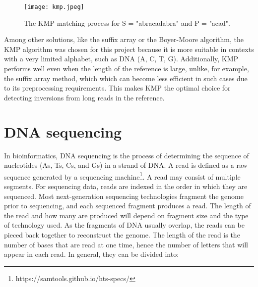 \begin{figure}[h]

  \centering
    \texttt{[image: kmp.jpeg]}
    \caption{The KMP matching process for S = "abracadabra" and P = "acad".}
  \label{fig:kmp}
\end{figure}

Among other solutions, like the suffix array or the Boyer-Moore algorithm, the KMP algorithm was chosen for this project because it is more suitable in contexts with a very limited alphabet, such as DNA ({A, C, T, G}). Additionally, KMP performs well even when the length of the reference is large, unlike, for example, the suffix array method, which which can become less efficient in such cases due to its preprocessing requirements. This makes KMP the optimal choice for detecting inversions from long reads in the reference. 

\section{DNA sequencing}

In bioinformatics, DNA sequencing is the process of determining the sequence of nucleotides (As, Ts, Cs, and Gs) in a strand of DNA. A read is defined as a raw sequence generated by a sequencing machine\footnote{https://samtools.github.io/hts-specs/}. A read may consist of multiple segments. For sequencing data, reads are indexed in the order in which they are sequenced. Most next-generation sequencing technologies fragment the genome prior to sequencing, and each sequenced fragment produces a read. The length of the read and how many are produced will depend on fragment size and the type of technology used. As the fragments of DNA usually overlap, the reads can be pieced back together to reconstruct the genome. The length of the read is the number of bases that are read at one time, hence the number of letters that will appear in each read. In general, they can be divided into:

